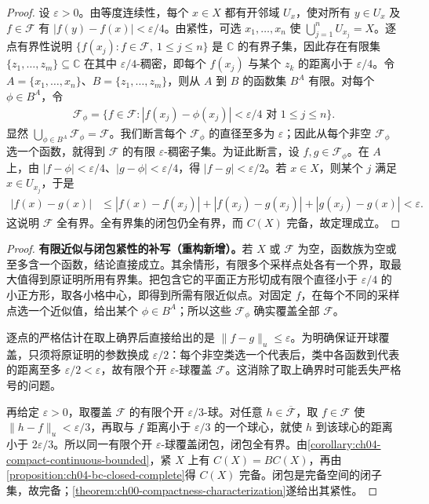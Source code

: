 \documentclass[../../main.tex]{subfiles}%
\begin{document}
\begin{proof}
设 $\varepsilon>0$。由等度连续性，每个 $x\in X$ 都有开邻域 $U_x$，使对所有 $y\in U_x$ 及 $f\in\mathcal F$ 有 $|f(y)-f(x)|<\varepsilon/4$。由紧性，可选 $x_1,\ldots,x_n$ 使 $\bigcup_{j=1}^nU_{x_j}=X$。逐点有界性说明 $\{f(x_j):f\in\mathcal F,\ 1\le j\le n\}$ 是 $\mathbb C$ 的有界子集，因此存在有限集 $\{z_1,\ldots,z_m\}\subseteq\mathbb C$ 在其中 $\varepsilon/4$-稠密，即每个 $f(x_j)$ 与某个 $z_k$ 的距离小于 $\varepsilon/4$。令 $A=\{x_1,\ldots,x_n\}$、$B=\{z_1,\ldots,z_m\}$，则从 $A$ 到 $B$ 的函数集 $B^A$ 有限。对每个 $\phi\in B^A$，令
\begin{align*}
\mathcal F_\phi=\{f\in\mathcal F:|f(x_j)-\phi(x_j)|<\varepsilon/4\text{ 对 }1\le j\le n\}.
\end{align*}
显然 $\bigcup_{\phi\in B^A}\mathcal F_\phi=\mathcal F$。我们断言每个 $\mathcal F_\phi$ 的直径至多为 $\varepsilon$；因此从每个非空 $\mathcal F_\phi$ 选一个函数，就得到 $\mathcal F$ 的有限 $\varepsilon$-稠密子集。为证此断言，设 $f,g\in\mathcal F_\phi$。在 $A$ 上，由 $|f-\phi|<\varepsilon/4$、$|g-\phi|<\varepsilon/4$，得 $|f-g|<\varepsilon/2$。若 $x\in X$，则某个 $j$ 满足 $x\in U_{x_j}$，于是
\begin{align*}
|f(x)-g(x)|
&\le |f(x)-f(x_j)|+|f(x_j)-g(x_j)|+|g(x_j)-g(x)|<\varepsilon.
\end{align*}
这说明 $\mathcal F$ 全有界。全有界集的闭包仍全有界，而 $C(X)$ 完备，故定理成立。
\end{proof}
\begin{proof}
\textbf{有限近似与闭包紧性的补写（重构新增）。}若 $X$ 或 $\mathcal F$ 为空，函数族为空或至多含一个函数，结论直接成立。其余情形，有限多个采样点处各有一个界，取最大值得到原证明所用有界集。把包含它的平面正方形切成有限个直径小于 $\varepsilon/4$ 的小正方形，取各小格中心，即得到所需有限近似点。对固定 $f$，在每个不同的采样点选一个近似值，给出某个 $\phi\in B^A$；所以这些 $\mathcal F_\phi$ 确实覆盖全部 $\mathcal F$。

逐点的严格估计在取上确界后直接给出的是 $\|f-g\|_u\le\varepsilon$。为明确保证开球覆盖，只须将原证明的参数换成 $\varepsilon/2$：每个非空类选一个代表后，类中各函数到代表的距离至多 $\varepsilon/2<\varepsilon$，故有限个开 $\varepsilon$-球覆盖 $\mathcal F$。这消除了取上确界时可能丢失严格号的问题。

再给定 $\varepsilon>0$，取覆盖 $\mathcal F$ 的有限个开 $\varepsilon/3$-球。对任意 $h\in\overline{\mathcal F}$，取 $f\in\mathcal F$ 使 $\|h-f\|_u<\varepsilon/3$，再取与 $f$ 距离小于 $\varepsilon/3$ 的一个球心，就使 $h$ 到该球心的距离小于 $2\varepsilon/3$。所以同一有限个开 $\varepsilon$-球覆盖闭包，闭包全有界。由\cref{corollary:ch04-compact-continuous-bounded}，紧 $X$ 上有 $C(X)=BC(X)$，再由\cref{proposition:ch04-bc-closed-complete}得 $C(X)$ 完备。闭包是完备空间的闭子集，故完备；\cref{theorem:ch00-compactness-characterization}遂给出其紧性。
\end{proof}
\end{document}

